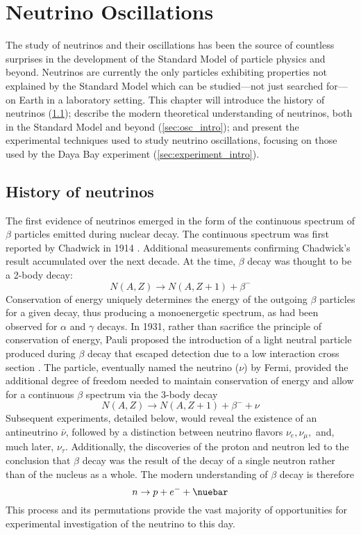 \chapter{Neutrino Oscillations}
\label{ch:intro}

The study of neutrinos and their oscillations has been the source
of countless surprises in the development of the
Standard Model of particle physics and beyond.
Neutrinos are currently the only particles exhibiting properties
not explained by the Standard Model
which can be studied---not just searched for---on Earth in a laboratory setting.
This chapter will introduce the history of neutrinos (\cref{sec:history});
describe the modern theoretical understanding of neutrinos,
both in the Standard Model and beyond (\cref{sec:osc_intro});
and present the experimental techniques used to study neutrino oscillations,
focusing on those used by the Daya Bay experiment (\cref{sec:experiment_intro}).


\section{History of neutrinos}
\label{sec:history}

The first evidence of neutrinos emerged in the form of
the continuous spectrum of $\beta$ particles
emitted during nuclear decay.
The continuous spectrum was first reported by Chadwick in 1914 \cite{chadwick_beta}.
Additional measurements confirming Chadwick's result accumulated over the next decade.
At the time, $\beta$ decay was thought to be a 2-body decay:
\begin{equation}\label{eq:old_beta}
    N(A, Z) \to N(A, Z+1) + \beta^-
\end{equation}
Conservation of energy uniquely determines the energy
of the outgoing $\beta$ particles for a given decay,
thus producing a monoenergetic spectrum,
as had been observed for $\alpha$ and $\gamma$ decays.
In 1931, rather than sacrifice the principle of conservation of energy,
Pauli proposed the introduction of a light neutral particle
produced during $\beta$ decay that escaped detection
due to a low interaction cross section \cite{pauli_letter}.
The particle, eventually named the neutrino ($\nu$) by Fermi,
provided the additional degree of freedom needed
to maintain conservation of energy and allow for a continuous $\beta$ spectrum
via the 3-body decay
\begin{equation}\label{eq:beta_mid}
    N(A, Z) \to N(A, Z+1) + \beta^- + \nu
\end{equation}
Subsequent experiments, detailed below,
would reveal the existence of an antineutrino $\bar{\nu}$,
followed by a distinction between neutrino flavors $\nu_e, \nu_\mu,$
and, much later, $\nu_\tau$.
Additionally, the discoveries of the proton and neutron
led to the conclusion that $\beta$ decay was the result of
the decay of a single neutron rather than of the nucleus as a whole.
The modern understanding of $\beta$ decay is therefore
\begin{equation}\label{eq:beta_modern}
    n \to p + e^- + \nuebar
\end{equation}
This process and its permutations
provide the vast majority of opportunities for
experimental investigation of the neutrino to this day.

